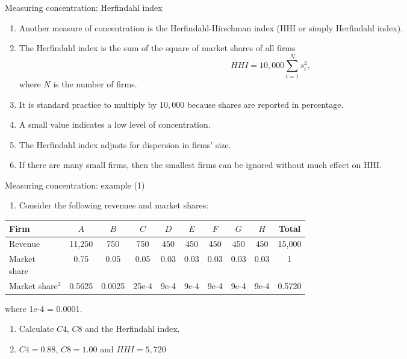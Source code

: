 \documentclass[table,xcolor=pdftex,dvipsnames]{beamer}\usepackage[]{graphicx}\usepackage[]{color}
\begin{document}

\begin{frame}{Measuring concentration: Herfindahl index}
\begin{enumerate}[label=\textbullet]
  \item Another measure of concentration is the Herfindahl-Hirschman index (HHI or simply Herfindahl index).
  \item The Herfindahl index is the sum of the square of market shares of all firms \[ HHI = 10,000\sum_{i=1}^{N} s_i^2,\]
  where $N$ is the number of firms.
  \item It is standard practice to multiply by $10,000$ because shares are reported in percentage.
  \item A small value indicates a low level of concentration.
  \item The Herfindahl index adjusts for dispersion in firms' size.
  \item If there are many small firms, then the smallest firms can be ignored without much effect on HHI.
\end{enumerate}
\end{frame}


\begin{frame}{Measuring concentration: example (1)}
\begin{enumerate}[label=\textbullet]
  \item Consider the following revenues and market shares:
\end{enumerate}
\begin{table}
\scriptsize
\begin{tabular}{l c c c c c c c c c}
  \toprule
Firm & $A$ & $B$ & $C$ & $D$ & $E$ & $F$ & $G$ & $H$ & Total\\
    \midrule
Revenue & 11,250 & 750 & 750 & 450 & 450 & 450 & 450 & 450 & 15,000\\
\parbox[b][][b]{0.25in}{Market\\share} & 0.75 & 0.05 & 0.05 & 0.03 & 0.03 & 0.03 & 0.03 & 0.03 & 1\\
\parbox[b][][b]{0.25in}{Market\\share$^2$}  & 0.5625 & 0.0025 & 25e-4 & 9e-4 & 9e-4 & 9e-4 & 9e-4 & 9e-4 & 0.5720\\
  \bottomrule
\end{tabular}
\end{table}
\vspace{-0.75\baselineskip}
where 1e-4 = 0.0001.
\begin{enumerate}[label=\textbullet]
  \item Calculate $C4$, $C8$ and the Herfindahl index.
  \pause
  \item $C4=0.88$, $C8=1.00$ and $HHI=5,720$
\end{enumerate}
\end{frame}
\end{document}
